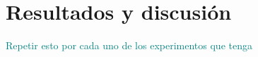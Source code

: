 \chapter{Resultados y discusión} \label{chap-6-Resultados-discusion}
\textcolor{teal}{Repetir esto por cada uno de los experimentos que tenga}


